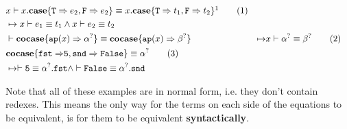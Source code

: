 \documentclass[twoside,12pt,a4paper]{article}
\begin{document}
\begin{example}
    \begin{align*}
    &x\vdash x.\expatmatch{\texttt{T} \Rightarrow e_2, \texttt{F} \Rightarrow e_2} \equiv x.\expatmatch{\texttt{T} \Rightarrow t_1, \texttt{F} \Rightarrow t_2}\footnotemark[1]\tag{1}
    \\ &\mapsto x\vdash  e_1 \equiv t_1\wedge x\vdash e_2\equiv t_2
    \\
    &\vdash \excopatmatch{\ap{x}\Rightarrow \alphaunifvar} \equiv \excopatmatch{\ap{x}\Rightarrow\betaunifvar} 
    &\mapsto&x\vdash \alphaunifvar \equiv \betaunifvar
    \tag{2}\\
    &\excopatmatch{\mathtt{fst \Rightarrow} \mathtt{5}, \mathtt{snd\Rightarrow False}}\equiv \alphaunifvar \tag{3}
    \\ &\mapsto \vdash \mathtt{5}\equiv \alphaunifvar.\mathtt{fst}\wedge \vdash \mathtt{False\equiv\alphaunifvar.snd}
    \end{align*}
\end{example}
Note that all of these examples are in normal form, i.e. they don't contain redexes.
This means the only way for the terms on each side of the equations to be equivalent,
is for them to be equivalent \textbf{syntactically}. 
\end{document}
